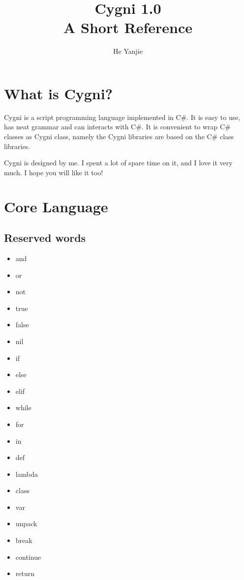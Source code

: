 \documentclass[]{article}
\title{Cygni 1.0\\ A Short Reference}
\author{He Yanjie}
\begin{document}
\maketitle

\begin{abstract}

\end{abstract}

\section{What is Cygni?}
Cygni is a script programming language implemented in C\#. It is easy to use, has neat grammar and can interacts with C\#. It is convenient to wrap C\# classes as Cygni class, namely the Cygni libraries are based on the C\# class libraries.

Cygni is designed by me. I spent a lot of spare time on it, and I love it very much. I hope you will like it too!

\section{Core Language}
\subsection{Reserved words}
\begin{itemize}
	\item and
	\item or
	\item not
	\item true
	\item false
	\item nil
	\item if
	\item else
	\item elif
	\item while
	\item for
	\item in
	\item def
	\item lambda
	\item class
	\item var
	\item unpack
	\item break
	\item continue
	\item return	
\end{itemize}
\end{document}
